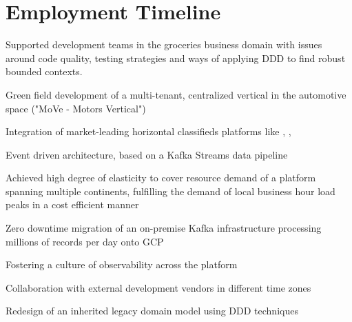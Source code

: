 \documentclass[]{resume}
\begin{document}
\hfill
\begin{minipage}[t]{0.64\textwidth} 


\section{Employment Timeline}

\vspace{\topsep} %
Supported development teams in the groceries business domain with issues around code quality, testing strategies and ways of applying DDD to find robust bounded contexts.
\sectionsep

\vspace{\topsep} %
\begin{tightemize}
\item Green field development of a multi-tenant, centralized vertical in the automotive space ("MoVe - Motors Vertical")
\item Integration of market-leading horizontal classifieds platforms like \href{https://www.kijiji.ca}{}, \href{https://www.gumtree.com.au}{}, \href{https://www.gumtree.co.uk}{}
\item Event driven architecture, based on a Kafka Streams data pipeline
\item Achieved high degree of elasticity to cover resource demand of a platform spanning multiple continents, fulfilling the demand of local business hour load peaks in a cost efficient manner
\item Zero downtime migration of an on-premise Kafka infrastructure processing millions of records per day onto GCP
\item Fostering a culture of observability across the platform
\item Collaboration with external development vendors in different time zones
\item Redesign of an inherited legacy domain model using DDD techniques
\end{tightemize}
\sectionsep


\end{minipage}
\end{document}
